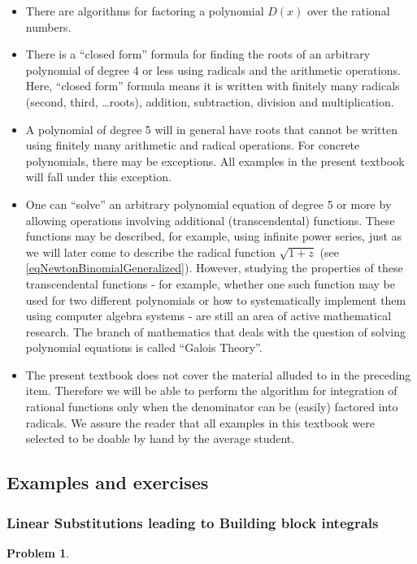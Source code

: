 \documentclass[12pt]{book}
\newtheorem{problem}[theorem]{Problem}
\begin{document}
\begin{itemize}
\item There are algorithms for factoring a polynomial $D(x)$ over the rational numbers.
\item There is a ``closed form'' formula for finding the roots of an arbitrary polynomial of degree 4 or less using radicals and the arithmetic operations. Here, ``closed form'' formula means it is written with finitely many radicals (second, third, \dots roots), addition, subtraction, division and multiplication.
\item A polynomial of degree 5 will in general have roots  that cannot be written using finitely many arithmetic and radical operations. For concrete polynomials, there may be exceptions. All examples in the present textbook will fall under this exception.
\item One can ``solve'' an arbitrary polynomial equation of degree 5 or more by allowing operations involving additional (transcendental) functions. These functions may be described, for example, using infinite power series, just as we will later come to describe the radical function $\sqrt{1+z}$ (see \eqref{eqNewtonBinomialGeneralized}). However, studying the properties of these transcendental functions - for example, whether one such function may be used for two different polynomials or how to systematically implement them using computer algebra systems - are still an area of active mathematical research. The branch of mathematics that deals with the question of solving polynomial equations is called ``Galois Theory''.
\item The present textbook does not cover the material alluded to in the preceding item. Therefore we will be able to perform the algorithm for integration of rational functions only when the denominator can be (easily) factored into radicals. We assure the reader that all examples in this textbook were selected to be doable by hand by the average student. 
\end{itemize}
\subsection{Examples and exercises}
\subsubsection{Linear Substitutions leading to Building block integrals}
\begin{problem}

\end{problem}

\end{document}
